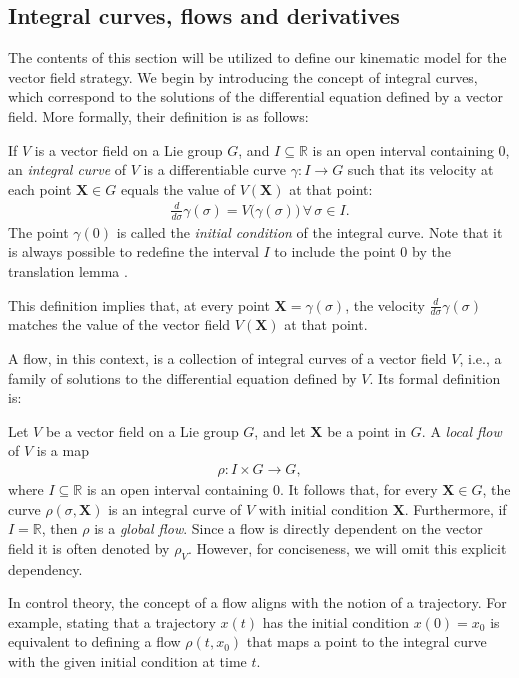 \subsection{Integral curves, flows and derivatives}
The contents of this section will be utilized to define our kinematic model for the vector field strategy. We begin by introducing the concept of integral curves, which correspond to the solutions of the differential equation defined by a vector field. More formally, their definition is as follows:
\begin{definition}
    If $V$ is a vector field on a Lie group $G$, and $I\subseteq \mathbb{R}$ is an open interval containing $0$, an \emph{integral curve} of $V$ is a differentiable curve $\gamma:I\to G$ such that its velocity at each point $\mathbf{X}\in G$ equals the value of $V(\mathbf{X})$ at that point:
    \begin{align*}
        \frac{d}{d\sigma}\gamma(\sigma) = V\bigl(\gamma(\sigma)\bigr)\,\forall\,\sigma\in I.
    \end{align*}
    The point $\gamma(0)$ is called the \emph{initial condition} of the integral curve. Note that it is always possible to redefine the interval $I$ to include the point $0$ by the translation lemma \citep[p. 208]{Lee2012}.
\end{definition}
This definition implies that, at every point $\mathbf{X}=\gamma(\sigma)$, the velocity $\frac{d}{d\sigma}\gamma(\sigma)$ matches the value of the vector field $V(\mathbf{X})$ at that point.

A flow, in this context, is a collection of integral curves of a vector field $V$, i.e., a family of solutions to the differential equation defined by $V$. Its formal definition is:
\begin{definition}
    Let $V$ be a vector field on a Lie group $G$, and let $\mathbf{X}$ be a point in $G$. A \emph{local flow} of $V$ is a map
    \begin{align*}
        \rho : I \times G \to G,
    \end{align*}
    where $I\subseteq\mathbb{R}$ is an open interval containing $0$. It follows that, for every $\mathbf{X}\in G$, the curve $\rho(\sigma, \mathbf{X})$ is an integral curve of $V$ with initial condition $\mathbf{X}$. Furthermore, if $I=\mathbb{R}$, then $\rho$ is a \emph{global flow}. Since a flow is directly dependent on the vector field it is often denoted by $\rho_V$. However, for conciseness, we will omit this explicit dependency.
\end{definition}
In control theory, the concept of a flow aligns with the notion of a trajectory. For example, stating that a trajectory $x(t)$ has the initial condition $x(0)=x_0$ is equivalent to defining a flow $\rho(t, x_0)$ that maps a point to the integral curve with the given initial condition at time $t$. 

